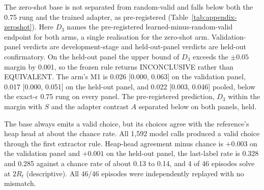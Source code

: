 The zero-shot base is not separated from random-valid and falls below both the 0.75 rung and the trained adapter, as pre-registered (Table~\ref{tab:appendix-zeroshot}). Here $D_3$ names the pre-registered learned-minus-random-valid endpoint for both arms, a single realisation for the zero-shot arm. Validation-panel verdicts are development-stage and held-out-panel verdicts are held-out confirmatory. On the held-out panel the upper bound of $D_3$ exceeds the $\pm 0.05$ margin by 0.001, so the frozen rule returns INCONCLUSIVE rather than EQUIVALENT. The arm's M1 is 0.026 [0.000, 0.063] on the validation panel, 0.017 [0.000, 0.051] on the held-out panel, and 0.022 [0.003, 0.046] pooled, below the exact-$\epsilon$ 0.75 rung on every panel. The pre-registered prediction, $D_3$ within the margin with $S$ and the adapter contrast $A$ separated below on both panels, held.

The base always emits a valid choice, but its choices agree with the reference's heap head at about the chance rate. All 1,592 model calls produced a valid choice through the first extractor rule. Heap-head agreement minus chance is $+0.003$ on the validation panel and $+0.001$ on the held-out panel, the last-label rate is 0.328 and 0.285 against a chance rate of about 0.13 to 0.14, and 4 of 46 episodes solve at $2R_t$ (descriptive). All 46/46 episodes were independently replayed with no mismatch.


